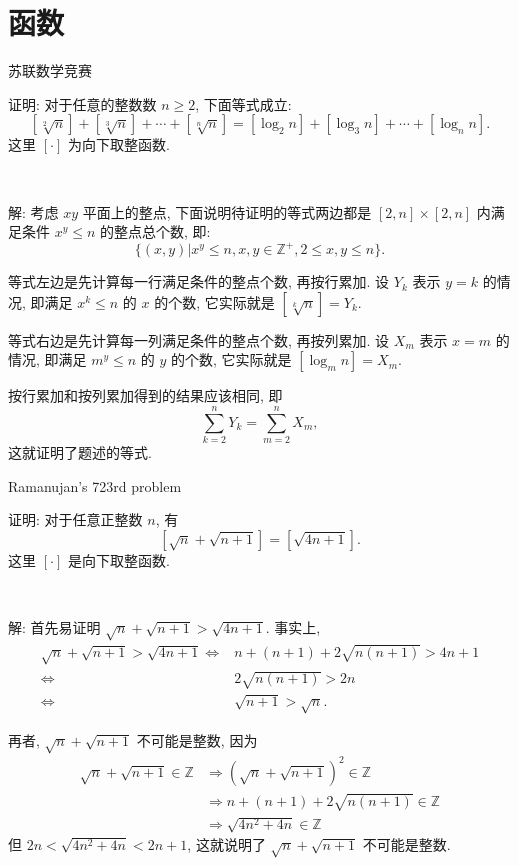 \newpage
\section{函数}

 苏联数学竞赛

证明: 对于任意的整数数 $n \ge 2$, 下面等式成立:
\[ [ \sqrt[2]{n} ] + [ \sqrt[3]{n} ] + \cdots + [ \sqrt[n]{n} ] = [ \log_2 n ] + [ \log_3 n ] + \cdots + [ \log_n n ] .\]
这里 $[\cdot]$ 为向下取整函数.

~

解: 考虑 $xy$ 平面上的整点, 下面说明待证明的等式两边都是 $[2,n]\times[2,n]$ 内满足条件 $x^y\le n$ 的整点总个数, 即:
\[\{(x,y) | x^y\le n, x,y\in\mathbb{Z}^+, 2\le x,y \le n \} .\]

等式左边是先计算每一行满足条件的整点个数, 再按行累加. 设 $Y_k$ 表示 $y=k$ 的情况, 即满足 $x^k\le n$ 的 $x$ 的个数, 它实际就是 $[ \sqrt[k]{n} ] = Y_k$.

等式右边是先计算每一列满足条件的整点个数, 再按列累加. 设 $X_m$ 表示 $x=m$ 的情况, 即满足 $m^y \le n$ 的 $y$ 的个数, 它实际就是 $[ \log_m n] = X_m$.

按行累加和按列累加得到的结果应该相同, 即
\[\sum_{k=2}^n Y_k = \sum_{m=2}^n X_m ,\]
这就证明了题述的等式.


\newpage
\noindent Ramanujan's 723rd problem

证明: 对于任意正整数 $n$, 有
\[ \left[\sqrt{n} + \sqrt{n+1}\right] = \left[\sqrt{4n+1}\right] .\]
这里 $[\cdot]$ 是向下取整函数.

~

解: 首先易证明 $\sqrt{n} + \sqrt{n+1} > \sqrt{4n+1}$. 事实上,
\begin{align*}
\sqrt{n} + \sqrt{n+1} > \sqrt{4n+1} \iff & n + (n+1) + 2\sqrt{n(n+1)} > 4n + 1 \\
\iff & 2\sqrt{n(n+1)} > 2n \\
\iff & \sqrt{n+1} > \sqrt{n} .
\end{align*}

再者, $\sqrt{n} + \sqrt{n+1}$ 不可能是整数, 因为
\begin{align*}
\sqrt{n} + \sqrt{n+1} \in \mathbb{Z} &\Rightarrow (\sqrt{n} + \sqrt{n+1})^2 \in \mathbb{Z} \\
&\Rightarrow n + (n+1) + 2\sqrt{n(n+1)} \in \mathbb{Z} \\
&\Rightarrow \sqrt{4n^2+4n} \in \mathbb{Z}
\end{align*}
但 $2n < \sqrt{4n^2+4n} < 2n+1$, 这就说明了 $\sqrt{n} + \sqrt{n+1}$ 不可能是整数.

